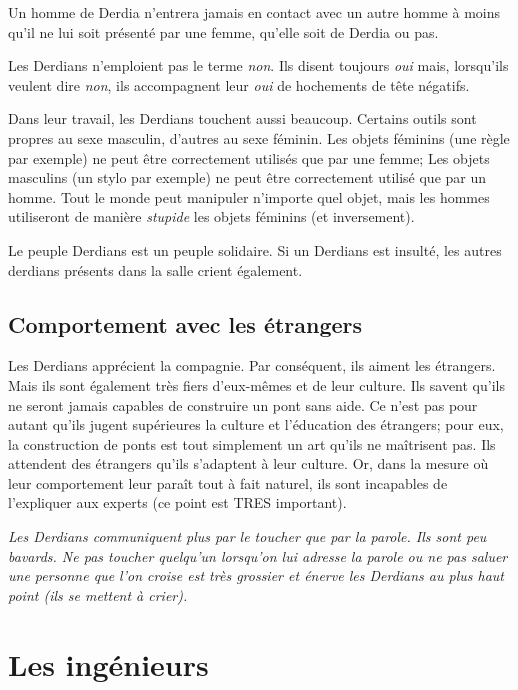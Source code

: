 \documentclass[11pt,a4paper]{article}
\begin{document}
Un homme de Derdia n'entrera jamais en contact avec un autre homme à moins qu'il ne lui soit présenté par une femme, qu'elle soit de Derdia ou pas.

Les Derdians n'emploient pas le terme \emph{non}. Ils disent toujours \emph{oui} mais, lorsqu'ils veulent dire \emph{non}, ils accompagnent leur \emph{oui} de hochements de tête négatifs.

Dans leur travail, les Derdians touchent aussi beaucoup.
Certains outils sont propres au sexe masculin, d'autres au sexe féminin.
Les objets féminins (une règle par exemple) ne peut être correctement utilisés que par une femme; Les objets masculins (un stylo par exemple) ne peut être correctement utilisé que par un homme.
Tout le monde peut manipuler n'importe quel objet, mais les hommes utiliseront de manière \emph{stupide} les objets féminins (et inversement).

Le peuple Derdians est un peuple solidaire. Si un Derdians est insulté, les autres derdians présents dans la salle crient également.
 
 \subsection{Comportement avec les étrangers}
 
 Les Derdians apprécient la compagnie.
 Par conséquent, ils aiment les étrangers.
 Mais ils sont également très fiers d'eux-mêmes et de leur culture.
 Ils savent qu'ils ne seront jamais capables de construire un pont sans aide.
 Ce n'est pas pour autant qu'ils jugent supérieures la culture et l'éducation des étrangers; pour eux, la construction de ponts est tout simplement un art qu'ils ne maîtrisent pas.
 Ils attendent des étrangers qu'ils s'adaptent à leur culture.
 Or, dans la mesure où leur comportement leur paraît tout à fait naturel, ils sont incapables de l'expliquer aux experts (ce point est TRES important).

 \emph{Les Derdians communiquent plus par le toucher que par la parole. Ils sont peu bavards. Ne pas toucher quelqu'un lorsqu'on lui adresse la parole ou ne pas saluer une personne que l'on croise est très grossier et énerve les Derdians au plus haut point (ils se mettent à crier).}

\pagebreak
 
\section{Les ingénieurs}
\end{document}
